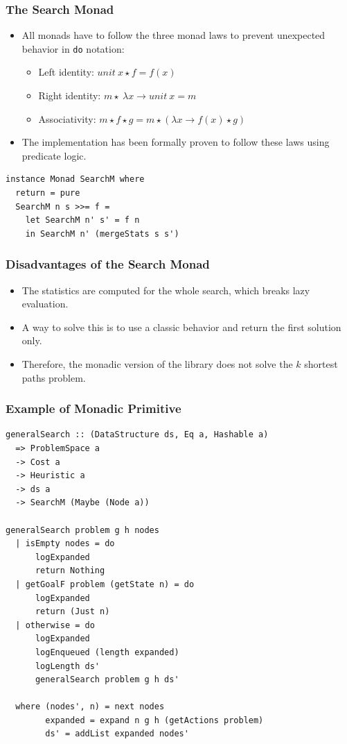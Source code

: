 \documentclass{beamer}
\begin{document}
\begin{frame}
  \frametitle{The Search Monad}
  \begin{itemize}
  \item All monads have to follow the three monad laws to prevent unexpected
    behavior in \texttt{do} notation:
    \begin{itemize}
    \item Left identity: $unit \  x \star f = f(x) $
    \item Right identity: $m \star \  \lambda x \rightarrow unit \  x = m$
    \item Associativity: $m \star f \star g = m \star (\lambda x \rightarrow
      f(x) \star g)$
    \end{itemize}
  \item The implementation has been formally proven to follow these laws using
    predicate logic.
  \end{itemize}

\begin{lstlisting}[style=haskell]
instance Monad SearchM where
  return = pure
  SearchM n s >>= f =
    let SearchM n' s' = f n
    in SearchM n' (mergeStats s s')
\end{lstlisting}
\end{frame}

\begin{frame}
  \frametitle{Disadvantages of the Search Monad}
  \begin{itemize}
  \item The statistics are computed for the whole search, which breaks lazy
    evaluation.
  \item A way to solve this is to use a classic behavior and return the first
    solution only.
  \item Therefore, the monadic version of the library does not solve the $k$
    shortest paths problem.
  \end{itemize}
\end{frame}

\begin{frame}[fragile]
  \frametitle{Example of Monadic Primitive}
\begin{lstlisting}[style=haskell]
generalSearch :: (DataStructure ds, Eq a, Hashable a)
  => ProblemSpace a
  -> Cost a
  -> Heuristic a
  -> ds a
  -> SearchM (Maybe (Node a))

generalSearch problem g h nodes
  | isEmpty nodes = do
      logExpanded
      return Nothing
  | getGoalF problem (getState n) = do
      logExpanded
      return (Just n)
  | otherwise = do
      logExpanded
      logEnqueued (length expanded)
      logLength ds'
      generalSearch problem g h ds'

  where (nodes', n) = next nodes
        expanded = expand n g h (getActions problem)
        ds' = addList expanded nodes'
\end{lstlisting}
\end{frame}
\end{document}
